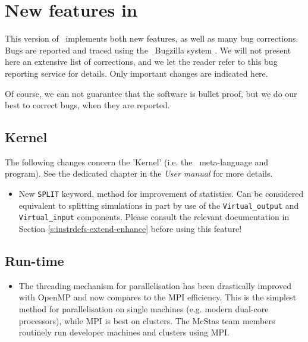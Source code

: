 
\chapter{New features in \MCS\ \version\ }
\label{c:changes}

This version of \MCS\ implements both new features, as well as many bug corrections. Bugs are reported and traced using the \MCS\ Bugzilla system \cite{mczilla_webpage}. We will not present here an extensive list of corrections, and we let the reader refer to this bug reporting service for details. Only important changes are indicated here.

Of course, we can not guarantee that the software is bullet proof, but we do our best to correct bugs, when they are reported.


\section{Kernel}
\label{s:new-features:kernel}

The following changes concern the 'Kernel' (i.e. the \MCS\ meta-language and program). See the dedicated chapter in the {\it User manual} for more details.

\begin{itemize}
\item New \verb+SPLIT+ keyword, method for improvement of statistics. Can be considered equivalent to splitting
  simulations in part by use of the \verb+Virtual_output+ and \verb+Virtual_input+ components. Please consult the
  relevant documentation in Section \ref{s:instrdefs-extend-enhance} before using this feature!
\end{itemize}

\section{Run-time}
\label{s:new-features:run-time}

\begin{itemize}
\item The threading mechanism for parallelisation has been drastically improved with OpenMP and now compares to the MPI efficiency. This is the simplest method for 
  parallelisation on single machines (e.g. modern dual-core processors), while MPI is best on clusters.
  The McStas team members routinely run developer machines and clusters using MPI.
\end{itemize}


